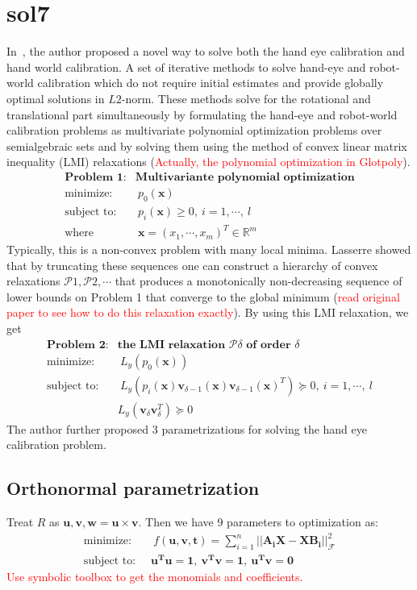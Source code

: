 \documentclass[a4paper]{report}
\begin{document}
\section{sol7}
In~\cite{heller2014hand}, the author proposed a novel way to solve both the hand eye calibration and hand world calibration. A set of iterative methods
to solve hand-eye and robot-world calibration which do not require initial estimates and provide globally optimal solutions in $L2$-norm. These methods solve for the rotational and translational part
simultaneously by formulating the hand-eye
and robot-world calibration problems as multivariate polynomial
optimization problems over semialgebraic sets and
by solving them using the method of convex linear matrix
inequality (LMI) relaxations (\textcolor{red}{Actually, the polynomial optimization in Glotpoly}).
\begin{align}
\textbf{Problem 1}:& \textbf{Multivariante polynomial optimization} \\
\text{minimize: }& \ p_0(\mathbf{x}) \\
\text{subject to: }& \ p_i(\mathbf{x}) \geq 0,\ i=1, \cdots,\ l \\
\text{where}& \ \mathbf{x}=(x_1, \cdots, x_m)^T \in \mathbb{R}^m
\end{align}
Typically, this is a non-convex problem with many local
minima. Lasserre
showed that by truncating these sequences one can construct
a hierarchy of convex relaxations $\mathcal{P}1,\mathcal{P}2, \cdots$ that produces
a monotonically non-decreasing sequence of lower bounds
on Problem 1 that converge to the global minimum (\textcolor{red}{read original paper to see how to do this relaxation exactly}). By using this LMI relaxation, we get 
\begin{align}
\textbf{Problem 2}:& \textbf{the LMI relaxation $\mathcal{P}\delta$ of order $\delta$} \\
\text{minimize: }& \ L_y(p_0(\mathbf{x})) \\
\text{subject to: }& \ L_y(p_i(\mathbf{x})\mathbf{v}_{\delta-1}(\mathbf{x})\mathbf{v}_{\delta-1}(\mathbf{x})^T) \succeq 0,\ i=1, \cdots,\ l \\
&  L_y(\mathbf{v}_{\delta}\mathbf{v}_{\delta}^T) \succeq 0
\end{align}
The author further proposed $3$ parametrizations for solving the hand eye calibration problem. 
\subsection{Orthonormal parametrization}
Treat $R$ as $\mathbf{u}, \mathbf{v}, \mathbf{w}=\mathbf{u} \times \mathbf{v}$. Then we have 9 parameters to optimization as:
\begin{align}
\text{minimize: }\ &\ f(\mathbf{u, v, t})=\sum_{i=1}^{n} 
||\mathbf{A_iX-XB_i}||_{\mathcal{F}}^2 \\
\text{subject to: }\ & \mathbf{u^Tu=1},\ \mathbf{v^Tv=1},\ \mathbf{u^Tv=0}
\end{align}
\textcolor{red}{Use symbolic toolbox to get the monomials and coefficients.}
\end{document}
